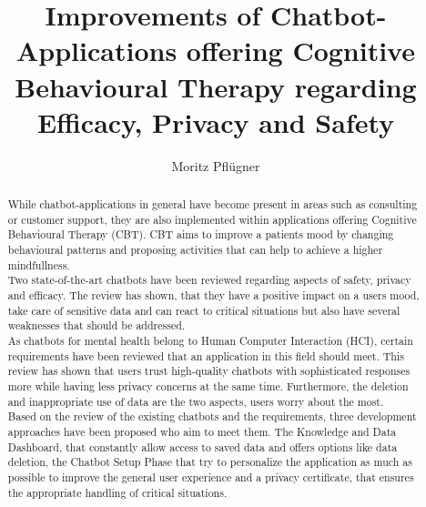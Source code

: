 \documentclass[sigconf, nonacm]{acmart}
\begin{document}
\graphicspath{ {./images/} }

\title{Improvements of Chatbot-Applications offering Cognitive Behavioural Therapy regarding Efficacy, Privacy and Safety}

\author{Moritz Pflügner}


\begin{abstract}
While chatbot-applications in general have become present in areas such as consulting or customer support, they are also implemented
within applications offering Cognitive Behavioural Therapy (CBT). CBT aims to improve a patients mood by changing behavioural patterns and proposing
activities that can help to achieve a higher mindfullness.
\\
Two state-of-the-art chatbots have been reviewed regarding aspects of safety, privacy and efficacy. The review has shown, that they have a positive 
impact on a users mood, take care of sensitive data and can react to critical situations but also have several weaknesses that should be addressed.
\\
As chatbots for mental health belong to Human Computer Interaction (HCI), certain requirements have been reviewed that an application in this field should meet. This review has shown
that users trust high-quality chatbots with sophisticated responses more while having less privacy concerns at the same time. Furthermore, the deletion and 
inappropriate use of data are the two aspects, users worry about the most. 
\\
Based on the review of the existing chatbots and the requirements, three development approaches have been proposed who aim to meet them.
The Knowledge and Data Dashboard, that constantly allow access to saved data and offers options like data deletion, 
the Chatbot Setup Phase that try to personalize the application as much as possible to improve the general user experience and 
a privacy certificate, that ensures the appropriate handling of critical situations.   
\end{abstract}
\end{document}
